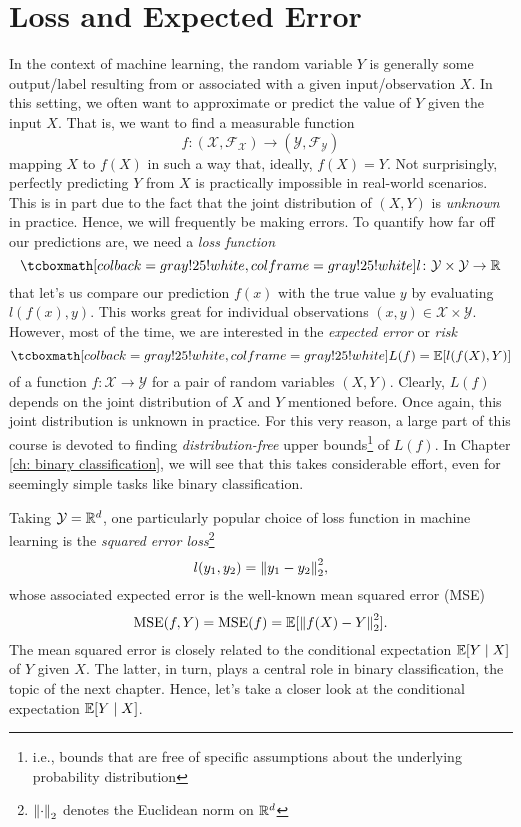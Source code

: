 \section{Loss and Expected Error}

In the context of machine learning, the random variable $Y$ is generally some output/label resulting from or associated with a given input/observation $X$. In this setting, we often want to approximate or predict the value of $Y$ given the input $X$. That is, we want to find a measurable function
\[
    f \colon (\mathcal{X}, \mathcal{F}_{\mathcal{X}}) \to (\mathcal{Y}, \mathcal{F}_{\mathcal{Y}})
\]
mapping $X$ to $f(X)$ in such a way that, ideally, $f(X) = Y$. Not surprisingly, perfectly predicting $Y$ from $X$ is practically impossible in real-world scenarios. This is in part due to the fact that the joint distribution of $(X, Y)$ is \emph{unknown} in practice. Hence, we will frequently be making errors. To quantify how far off our predictions are, we need a \emph{loss function}
\[
    \highlightMath{
        l \colon \mathcal{Y} \times \mathcal{Y} \to \R
    }
\]
that let's us compare our prediction $f(x)$ with the true value $y$ by evaluating $l(f(x), y)$. This works great for individual observations $(x, y) \in \mathcal{X} \times \mathcal{Y}$. However, most of the time, we are interested in the \emph{expected error} or \emph{risk}
\[
    \highlightMath{
        L(f) = \Exp[l(f(X), Y)]
    }
\]
of a function $f \colon \mathcal{X} \to \mathcal{Y}$ for a pair of random variables $(X, Y)$. Clearly, $L(f)$ depends on the joint distribution of $X$ and $Y$ mentioned before. Once again, this joint distribution is unknown in practice. For this very reason, a large part of this course is devoted to finding \emph{distribution-free} upper bounds\footnote{i.e., bounds that are free of specific assumptions about the underlying probability distribution} of $L(f)$. In Chapter \ref{ch: binary classification}, we will see that this takes considerable effort, even for seemingly simple tasks like binary classification.

Taking $\mathcal{Y} = \mathbb{R}^d$, one particularly popular choice of loss function in machine learning is the \emph{squared error loss}\footnote{$\norm{\cdot}_2$ denotes the Euclidean norm on $\mathbb{R}^d$}
\[
    l(y_1, y_2) = \norm{y_1 - y_2}_2^2,
\]
whose associated expected error is the well-known mean squared error (MSE)
\[
    \operatorname{MSE}(f, Y) = \operatorname{MSE}(f) = \operatorname{\mathbb{E}}[\norm{f(X) - Y}_2^2].
\]
The mean squared error is closely related to the conditional expectation $\operatorname{\mathbb{E}}[Y \mathrel{|} X]$ of $Y$ given $X$. The latter, in turn, plays a central role in binary classification, the topic of the next chapter. Hence, let's take a closer look at the conditional expectation $\operatorname{\mathbb{E}}[Y \mathrel{|} X]$.
